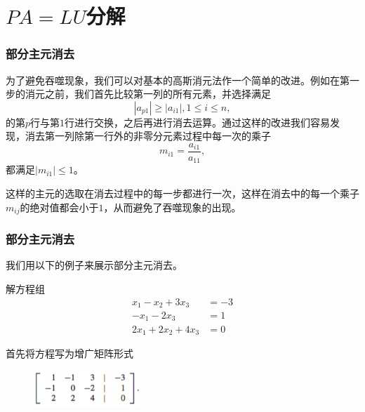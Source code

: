 \documentclass[10pt]{beamer}
\begin{document}
\section{$PA = LU$分解}

\begin{frame}
\frametitle{部分主元消去}
为了避免吞噬现象，我们可以对基本的高斯消元法作一个简单的改进。例如在第一步的消元之前，我们首先比较第一列的所有元素，并选择满足
\begin{equation}
|a_{p1}| \ge |a_{i1}|, 1 \le i \le n,
\end{equation}
的第$p$行与第$1$行进行交换，之后再进行消去运算。通过这样的改进我们容易发现，消去第一列除第一行外的非零分元素过程中每一次的乘子
\begin{equation}
m_{i1} = \frac{a_{i1}}{a_{11}},
\end{equation}
都满足$|m_{i1}| \le 1$。

这样的主元的选取在消去过程中的每一步都进行一次，这样在消去中的每一个乘子$m_{ij}$的绝对值都会小于$1$，从而避免了吞噬现象的出现。
\end{frame}


\begin{frame}
\frametitle{部分主元消去}
我们用以下的例子来展示部分主元消去。
\begin{example}
解方程组
\begin{align}
x_1 - x_2 + 3 x_3 &= -3 \nonumber \\
- x_1 - 2 x_3 &= 1 \nonumber \\
2x_1 + 2x_2 + 4 x_3 &= 0
\end{align}
\end{example}
首先将方程写为增广矩阵形式
\begin{figure}
\includegraphics[width=4cm]{figs/2_4_P_Pivoting-1} 
\end{figure}
\end{frame}
\end{document}
